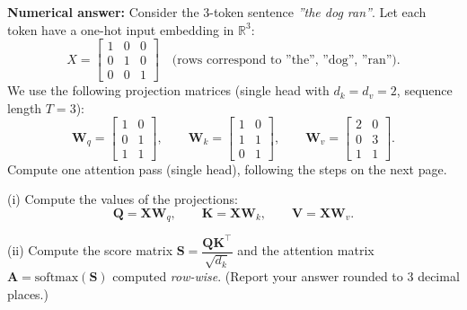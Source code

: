\documentclass[11pt,addpoints,answers]{exam}
\newcommand{\Av}{\mathbf{A}}
\newcommand{\Kv}{\mathbf{K}}
\newcommand{\Qv}{\mathbf{Q}}
\newcommand{\Sv}{\mathbf{S}}
\newcommand{\Vv}{\mathbf{V}}
\newcommand{\Wv}{\mathbf{W}}
\newcommand{\Xv}{\mathbf{X}}
\begin{document}
\begin{questions}
\begin{parts}
\begin{subparts}
    \subpart[4] \textbf{Numerical answer:}
    Consider the 3-token sentence \emph{''the dog ran''}. Let each token have a one-hot input embedding in \(\mathbb{R}^3\):
    \[
    X=\begin{bmatrix}
    1&0&0\\[2pt]
    0&1&0\\[2pt]
    0&0&1
    \end{bmatrix}
    \quad\text{(rows correspond to ''the'', ''dog'', ''ran'').}
    \]    
    We use the following projection matrices (single head with \(d_k=d_v=2\), sequence length \(T=3\)):
    \[
    \Wv_q=\begin{bmatrix}1&0\\[2pt]0&1\\[2pt]1&1\end{bmatrix},
    \qquad
    \Wv_k=\begin{bmatrix}1&0\\[2pt]1&1\\[2pt]0&1\end{bmatrix},
    \qquad
    \Wv_v=\begin{bmatrix}2&0\\[2pt]0&3\\[2pt]1&1\end{bmatrix}.
    \]
    Compute one attention pass (single head), following the steps on the next page.\\

    \clearpage 
    
    (i) Compute the values of the projections:
    \[
    \Qv = \Xv \Wv_q,\qquad \Kv = \Xv \Wv_k,\qquad \Vv = \Xv \Wv_v.
    \]

    \begin{answer_box}[title=$\Qv$,height=3.5cm,width=4.7cm,nobeforeafter]
    \end{answer_box}    
    \begin{answer_box}[title=$\Kv$,height=3.5cm,width=4.7cm,nobeforeafter]
    \end{answer_box}    
    \begin{answer_box}[title=$\Vv$,height=3.5cm,width=4.7cm,nobeforeafter]
    \end{answer_box}
    
    
    (ii) Compute the score matrix \(\Sv=\dfrac{\Qv \Kv^\top}{\sqrt{d_k}}\) and the attention matrix \(\Av=\mathrm{softmax}(\Sv)\) computed \emph{row-wise}. (Report your answer rounded to 3 decimal places.)


    \begin{answer_box}[title=$\Qv$,height=3.5cm,width=7.4cm,nobeforeafter]
    \end{answer_box}    
    \begin{answer_box}[title=$\Kv$,height=3.5cm,width=7.4cm,nobeforeafter]
    \end{answer_box}   


\end{subparts}
\end{parts}
\end{questions}
\end{document}
